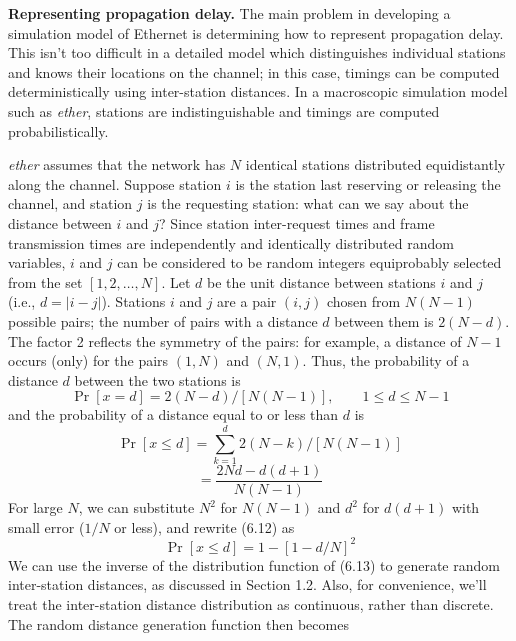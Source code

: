 \noindent\textbf{Representing propagation delay.} The main problem in developing a simulation model of Ethernet is determining how to represent propagation delay. This isn't too difficult in a detailed model which distinguishes individual stations and knows their locations on the channel; in this case, timings can be computed deterministically using inter-station distances. In a macroscopic simulation model such as \emph{ether}, stations are indistinguishable and timings are computed probabilistically.

\emph{ether} assumes that the network has $N$ identical stations distributed equidistantly along the channel. Suppose station $i$ is the station last reserving or releasing the channel, and station $j$ is the requesting station: what can we say about the distance between $i$ and $j$? Since station inter-request times and frame transmission times are independently and identically distributed random variables, $i$ and $j$ can be considered to be random integers equiprobably selected from the set $[1,2,\ldots,N]$. Let $d$ be the unit distance between stations $i$ and $j$ (i.e., $d=|i-j|$). Stations $i$ and $j$ are a pair $(i,j)$ chosen from $N(N-1)$ possible pairs; the number of pairs with a distance $d$ between them is $2(N-d)$. The factor 2 reflects the symmetry of the pairs: for example, a distance of $N-1$ occurs (only) for the pairs $(1,N)$ and $(N,1)$. Thus, the probability of a distance $d$ between the two stations is
\begin{equation} \Pr[x=d]=2(N-d)/[N(N-1)],\qquad 1\le d\le N-1 \end{equation}
and the probability of a distance equal to or less than $d$ is
\begin{equation} \Pr[x\le d]=\sum_{k=1}^{d}2(N-k)/[N(N-1)] \end{equation}
\begin{equation} =\frac{2Nd-d(d+1)}{N(N-1)} \end{equation}
For large $N$, we can substitute $N^2$ for $N(N-1)$ and $d^2$ for $d(d+1)$ with small error ($1/N$ or less), and rewrite (6.12) as
\begin{equation} \Pr[x\le d]=1-[1-d/N]^2 \end{equation}
We can use the inverse of the distribution function of (6.13) to generate random inter-station distances, as discussed in Section 1.2. Also, for
\noindent convenience, we'll treat the inter-station distance distribution as continuous, rather than discrete. The random distance generation function then becomes
